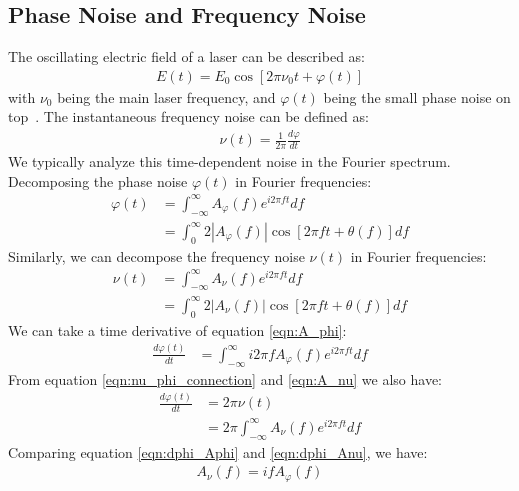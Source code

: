 \documentclass[11pt]{report}
\begin{document}
\subsection{Phase Noise and Frequency Noise}

The oscillating electric field of a laser can be described as:
\begin{align}
    E(t) = E_0 \cos[2\pi\nu_0t + \varphi(t)]
\end{align}
with $\nu_0$ being the main laser frequency, and $\varphi(t)$ being the small phase noise on top~\cite{Denecker2025}. The instantaneous frequency noise can be defined as:
\begin{align}
    \nu(t) = \frac{1}{2\pi} \frac{d\varphi}{dt} \label{eqn:nu_phi_connection}
\end{align}
We typically analyze this time-dependent noise in the Fourier spectrum. Decomposing the phase noise $\varphi(t)$ in Fourier frequencies:
\begin{align}
    \varphi(t) &= \int_{-\infty}^{\infty} A_\varphi(f) e^{i 2\pi ft}df  \label{eqn:A_phi} \\
    &= \int_{0}^{\infty} 2 |A_\varphi(f)| \cos[2\pi ft + \theta(f)]df
\end{align}
Similarly, we can decompose the frequency noise $\nu(t)$ in Fourier frequencies:
\begin{align}
    \nu(t) &= \int_{-\infty}^{\infty} A_\nu(f) e^{i 2\pi ft}df \label{eqn:A_nu}\\
    &= \int_{0}^{\infty} 2 |A_\nu(f)| \cos[2\pi ft + \theta(f)]df
\end{align}
We can take a time derivative of equation \ref{eqn:A_phi}:
\begin{align}
    \frac{d\varphi(t)}{dt}  &=  \int_{-\infty}^{\infty} i 2 \pi f A_\varphi(f) e^{i 2\pi ft}df \label{eqn:dphi_Aphi}
\end{align}
From equation \ref{eqn:nu_phi_connection} and \ref{eqn:A_nu} we also have:
\begin{align}
    \frac{d\varphi(t)}{dt} &= 2\pi \nu(t) \\
    &= 2\pi \int_{-\infty}^{\infty} A_\nu(f) e^{i 2\pi ft}df \label{eqn:dphi_Anu}
\end{align}
Comparing equation \ref{eqn:dphi_Aphi} and \ref{eqn:dphi_Anu}, we have:
\begin{align}
    A_\nu(f) = i f A_\varphi(f)
\end{align}
\end{document}
